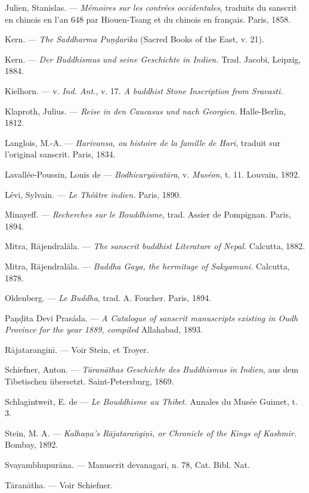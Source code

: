 \documentclass[a4paper, 11pt, oneside, french]{article}
\begin{document}
Julien, Stanislas. --- \emph{Mémoires sur les contrées occidentales}, traduits du sanscrit en chinois en l'an 648 par Hiouen-Tsang et du chinois en français. Paris, 1858.

Kern. --- \emph{The Saddharma Pu\d{n}\d{d}ar\={\i}ka} (Sacred Books of the East, v. 21).

Kern. --- \emph{Der Buddhismus und seine Geschichte in Indien.} Trad. Jacobi, Leipzig, 1884.

Kielhorn. --- v. \emph{Ind. Ant.}, v. 17. \emph{A buddhist Stone Inscription from Sravasti.}

Klaproth, Julius. --- \emph{Reise in den Caucasus und nach Georgien.} Halle-Berlin, 1812.

Langlois, M.-A. --- \emph{Harivansa, ou histoire de la famille de Hari}, traduit sur l'original sanscrit. Paris, 1834.

Lavallée-Poussin, Louis de --- \emph{Bodhicary\={a}vat\={a}ra}, v. \emph{Muséon}, t. 11. Louvain, 1892.

Lévi, Sylvain. --- \emph{Le Théâtre indien.} Paris, 1890.

Minayeff. --- \emph{Recherches sur le Bouddhisme}, trad. Assier de Pompignan. Paris, 1894.

Mitra, R\={a}jendral\={a}la. --- \emph{The sanscrit buddhist Literature of Nepal.} Calcutta, 1882.

Mitra, R\={a}jendral\={a}la. --- \emph{Buddha Gaya, the hermitage of Sakyamuni.} Calcutta, 1878.

Oldenberg. --- \emph{Le Buddha}, trad. A. Foucher. Paris, 1894.

Pa\d{n}\d{d}ita Devi Prasáda. --- \emph{A Catalogue of sanscrit manuscripts existing in Oudh Province for the year 1889, compiled} Allahabad, 1893.

R\={a}jatarangin\={\i}. --- Voir Stein, et Troyer.

Schiefner, Anton. --- \emph{T\={a}ran\={a}thas Geschichte des Buddhismus in Indien}, aus dem Tibetischen übersetzt. Saint-Petersburg, 1869.

Schlagintweit, E. de --- \emph{Le Bouddhisme au Thibet.} Annales du Musée Guimet, t. 3.

Stein, M. A. --- \emph{Kalha\d{n}a's R\={a}jatara\.{n}gi\d{n}\={\i}, or Chronicle of the Kings of Kashmir.} Bombay, 1892.

Svayambhupur\={a}na. --- Manuscrit devanagari, n. 78, Cat. Bibl. Nat.

T\={a}ran\={a}tha. --- Voir Schiefner.
\end{document}
